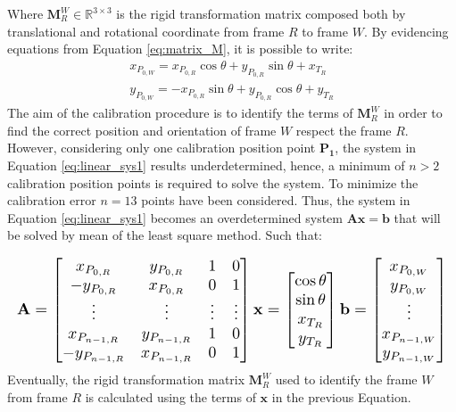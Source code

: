 \documentclass[letterpaper, 10 pt, conference]{ieeeconf}  %
\begin{document}
Where $\mathbf{M}^W_{R}\in\mathbb{R}^{3\times3}$ is the rigid transformation matrix composed both by translational and rotational coordinate from frame $R$ to frame $W$. By evidencing equations from Equation \ref{eq:matrix_M}, it is possible to write:
\begin{equation}\label{eq:linear_sys1}
\begin{gathered}
x_{P_{0,W}}=x_{P_{0,R}}\cos\theta+y_{P_{0,R}}\sin\theta+x_{T_R}\\
y_{P_{0,W}}=-x_{P_{0,R}}\sin\theta+y_{P_{0,R}}\cos\theta+y_{T_R}
\end{gathered}
\end{equation}
The aim of the calibration procedure is to identify the terms of $\mathbf{M}^W_{R}$ in order to find the correct position and orientation of frame $W$ respect the frame $R$. However, considering only one calibration position point $\mathbf{P_1}$, the system in Equation \ref{eq:linear_sys1} results underdetermined, hence, a minimum of $n>2$ calibration position points is required to solve the system. To minimize the calibration error $n=13$ points have been considered. Thus, the system in Equation \ref{eq:linear_sys1} becomes an overdetermined system $\mathbf{A}\mathbf{x}=\mathbf{b}$ that will be solved by mean of the least square method. Such that:

\begin{equation}\label{eq:linear_sys2}
\resizebox{\columnwidth}{!}{$%
	\begin{gathered}
	\mathbf{A} =   \begin{bmatrix}
	x_{P_{0,R}} & y_{P_{0,R}} & 1 & 0\\
	-y_{P_{0,R}} & x_{P_{0,R}} & 0 & 1 \\
	\vdots & \vdots & \vdots & \vdots\\
	x_{P_{n-1,R}} & y_{P_{n-1,R}} & 1 & 0\\
	-y_{P_{n-1,R}} & x_{P_{n-1,R}} & 0 & 1 
	\end{bmatrix}
	\mathbf{x} =   \begin{bmatrix}
	\cos\theta\\
	\sin\theta\\
	x_{T_R}\\
	y_{T_R}
	\end{bmatrix}
	\mathbf{b} =   \begin{bmatrix}
	x_{P_{0,W}}\\
	y_{P_{0,W}}\\
	\vdots\\
	x_{P_{n-1,W}}\\
	y_{P_{n-1,W}}\\
	\end{bmatrix}
	\end{gathered}
	$%
}%
\end{equation}
Eventually, the rigid transformation matrix $\mathbf{M}^W_{R}$ used to identify the frame $W$ from frame $R$ is calculated using the terms of $\mathbf{x}$ in the previous Equation.
\end{document}
